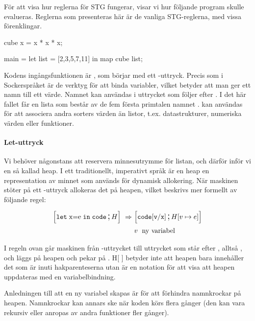 \documentclass[../Core]{subfiles}
\begin{document}
För att visa hur reglerna
för STG  fungerar, visar vi hur följande program skulle evalueras.
Reglerna som presenteras här är de vanliga STG-reglerna\cite{marlow2006making},
med vissa förenklingar.

\begin{codeEx}
cube x = x * x * x;

main = let list = [2,3,5,7,11]
        in map cube list;
\end{codeEx}

Kodens ingångsfunktionen är , som börjar med ett -uttryck.
Precis som i Sockerspråket är de verktyg för att binda variabler, vilket betyder att man ger ett
namn till ett värde. Namnet kan användas i uttrycket som följer efter .
I det här fallet får en lista som består av de fem första primtalen namnet .
 kan användas för att associera andra sorters värden än listor,
t.ex. datastrukturer, numeriska värden eller funktioner.

\paragraph{Let-uttryck} Vi behöver någonstans att reservera minnesutrymme för listan, och därför
inför vi en så kallad heap. I ett traditionellt, imperativt språk är
en heap en representation av minnet som används för dynamisk allokering. När
maskinen stöter på ett -uttryck allokeras det på heapen, vilket
beskrivs mer formellt av följande regel:

\begin{align*}
\text{\large$$}\Big[\mathtt{let\;\mathrm{x\mathtt{=}e}\; in\; code} \,\text{\Large;}\, H\Big]\,\,\Rightarrow\,\, & \text{\large$$}\Big[\mathtt{code[v/x]} \,\text{\Large;}\, H[v\mapsto e]\Big] \\
 & v\; \text{ ny variabel} \nonumber
\end{align*}

I regeln ovan går maskinen från -uttrycket till
uttrycket som står efter , alltså ,
och  läggs på heapen och pekar på .
H{[} {]} betyder inte att heapen bara innehåller det som är inuti
hakparenteserna utan är en notation för att visa att heapen
uppdateras med en variabelbindning.

Anledningen till att en ny variabel  skapas är för att förhindra namnkrockar på heapen. Namnkrockar kan annars ske när koden körs flera gånger (den kan vara rekursiv eller anropas av andra funktioner fler gånger). 

\end{document}
